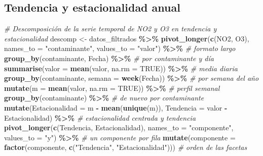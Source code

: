 \documentclass[notspecified,article,submit,oneauthor,pdftex]{Definitions/mdpi}
\newenvironment{Shaded}{\begin{snugshade}}{\end{snugshade}}
\newcommand{\AttributeTok}[1]{\textcolor[rgb]{0.13,0.29,0.53}{#1}}
\newcommand{\CommentTok}[1]{\textcolor[rgb]{0.56,0.35,0.01}{\textit{#1}}}
\newcommand{\ConstantTok}[1]{\textcolor[rgb]{0.56,0.35,0.01}{#1}}
\newcommand{\FunctionTok}[1]{\textcolor[rgb]{0.13,0.29,0.53}{\textbf{#1}}}
\newcommand{\NormalTok}[1]{#1}
\newcommand{\OtherTok}[1]{\textcolor[rgb]{0.56,0.35,0.01}{#1}}
\newcommand{\SpecialCharTok}[1]{\textcolor[rgb]{0.81,0.36,0.00}{\textbf{#1}}}
\newcommand{\StringTok}[1]{\textcolor[rgb]{0.31,0.60,0.02}{#1}}
\begin{document}
\subsection{Tendencia y estacionalidad
anual}\label{tendencia-y-estacionalidad-anual}

\begin{Shaded}
\begin{Highlighting}[]
\CommentTok{\# Descomposición de la serie temporal de NO2 y O3 en tendencia y estacionalidad}
\NormalTok{descomp }\OtherTok{\textless{}{-}}\NormalTok{ datos\_filtrados }\SpecialCharTok{\%\textgreater{}\%}
  \FunctionTok{pivot\_longer}\NormalTok{(}\FunctionTok{c}\NormalTok{(NO2, O3), }\AttributeTok{names\_to =} \StringTok{"contaminante"}\NormalTok{, }\AttributeTok{values\_to =} \StringTok{"valor"}\NormalTok{) }\SpecialCharTok{\%\textgreater{}\%}  \CommentTok{\# formato largo}
  \FunctionTok{group\_by}\NormalTok{(contaminante, Fecha) }\SpecialCharTok{\%\textgreater{}\%}                                              \CommentTok{\# por contaminante y día}
  \FunctionTok{summarise}\NormalTok{(}\AttributeTok{valor =} \FunctionTok{mean}\NormalTok{(valor, }\AttributeTok{na.rm =} \ConstantTok{TRUE}\NormalTok{)) }\SpecialCharTok{\%\textgreater{}\%}                               \CommentTok{\# media diaria}
  \FunctionTok{group\_by}\NormalTok{(contaminante, }\AttributeTok{semana =} \FunctionTok{week}\NormalTok{(Fecha)) }\SpecialCharTok{\%\textgreater{}\%}                               \CommentTok{\# por semana del año}
  \FunctionTok{mutate}\NormalTok{(}\AttributeTok{m =} \FunctionTok{mean}\NormalTok{(valor, }\AttributeTok{na.rm =} \ConstantTok{TRUE}\NormalTok{)) }\SpecialCharTok{\%\textgreater{}\%}                                      \CommentTok{\# perfil semanal}
  \FunctionTok{group\_by}\NormalTok{(contaminante) }\SpecialCharTok{\%\textgreater{}\%}                                                     \CommentTok{\# de nuevo por contaminante}
  \FunctionTok{mutate}\NormalTok{(}\AttributeTok{Estacionalidad =}\NormalTok{ m }\SpecialCharTok{{-}} \FunctionTok{mean}\NormalTok{(}\FunctionTok{unique}\NormalTok{(m)), }\AttributeTok{Tendencia =}\NormalTok{ valor }\SpecialCharTok{{-}}\NormalTok{ Estacionalidad) }\SpecialCharTok{\%\textgreater{}\%}  \CommentTok{\# estacionalidad centrada y tendencia}
  \FunctionTok{pivot\_longer}\NormalTok{(}\FunctionTok{c}\NormalTok{(Tendencia, Estacionalidad), }\AttributeTok{names\_to =} \StringTok{"componente"}\NormalTok{, }\AttributeTok{values\_to =} \StringTok{"y"}\NormalTok{) }\SpecialCharTok{\%\textgreater{}\%}  \CommentTok{\# un componente por fila}
  \FunctionTok{mutate}\NormalTok{(}\AttributeTok{componente =} \FunctionTok{factor}\NormalTok{(componente, }\FunctionTok{c}\NormalTok{(}\StringTok{"Tendencia"}\NormalTok{, }\StringTok{"Estacionalidad"}\NormalTok{)))      }\CommentTok{\# orden de las facetas}


\end{Highlighting}
\end{Shaded}
\end{document}
